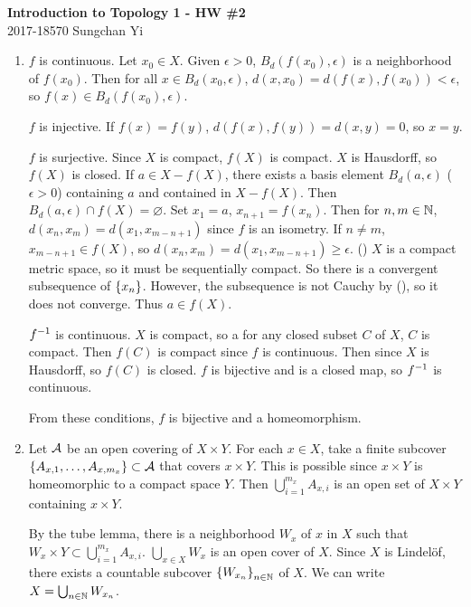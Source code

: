 \documentclass[12pt]{report}
\newcommand{\prob}[1]{\item[\large\textbf{\sffamily #1.}]}
\begin{document}
\begin{center}
    \textbf{\Large Introduction to Topology 1 - HW \#2}\\
    \large 2017-18570 Sungchan Yi
\end{center}
\begin{enumerate}
    \prob{1} \(f\) is continuous. Let \(x_0 \in X\). Given \(\epsilon > 0\), \(B_d(f(x_0), \epsilon)\) is a neighborhood of \(f(x_0)\). Then for all \(x \in B_d(x_0, \epsilon)\), \(d(x, x_0) = d(f(x), f(x_0)) < \epsilon\), so \(f(x) \in B_d(f(x_0), \epsilon)\).

    \(f\) is injective. If \(f(x) = f(y)\), \(d(f(x), f(y)) = d(x, y) = 0\), so \(x = y\).

    \(f\) is surjective. Since \(X\) is compact, \(f(X)\) is compact. \(X\) is Hausdorff, so \(f(X)\) is closed. If \(a \in X - f(X)\), there exists a basis element \(B_d(a, \epsilon)\) (\(\epsilon > 0\)) containing \(a\) and contained in \(X - f(X)\). Then \(B_d(a, \epsilon) \cap f(X) = \varnothing\). Set \(x_1 = a\), \(x_{n+1} = f(x_n)\). Then for \(n, m \in \mathbb{N}\), \(d(x_n, x_m) = d(x_1, x_{m-n+1})\) since \(f\) is an isometry. If \(n \neq m\), \(x_{m-n+1} \in f(X)\), so \(d(x_n, x_m) = d(x_1, x_{m-n+1}) \geq \epsilon\). (\mast) \(X\) is a compact metric space, so it must be sequentially compact. So there is a convergent subsequence of \(\left\{ x_n \right\}\). However, the subsequence is not Cauchy by (\mast), so it does not converge. Thus \(a \in f(X)\).

    \(f^{-1}\) is continuous. \(X\) is compact, so a for any closed subset \(C\) of \(X\), \(C\) is compact. Then \(f(C)\) is compact since \(f\) is continuous. Then since \(X\) is Hausdorff, so \(f(C)\) is closed. \(f\) is bijective and is a closed map, so \(f^{-1}\) is continuous.

    From these conditions, \(f\) is bijective and a homeomorphism.

    \prob{2} Let \(\mathcal{A}\) be an open covering of \(X \times Y\). For each \(x \in X\), take a finite subcover \(\{A_{x, 1}, \dots, A_{x, m_x}\} \\\subset \mathcal{A}\) that covers \(x \times Y\). This is possible since \(x \times Y\) is homeomorphic to a compact space \(Y\). Then \(\bigcup_{i=1}^{m_x} A_{x, i}\) is an open set of \(X \times Y\) containing \(x \times Y\).

    By the tube lemma, there is a neighborhood \(W_x\) of \(x\) in \(X\) such that \(W_x \times Y \subset \bigcup_{i=1}^{m_x} A_{x, i}\). \(\bigcup_{x \in X} W_x\) is an open cover of \(X\). Since \(X\) is Lindelöf, there exists a countable subcover \(\left\{ W_{x_n} \right\}_{n \in \mathbb{N}}\) of \(X\). We can write \(X = \bigcup_{n \in \mathbb{N}} W_{x_n}\).


\end{enumerate}
\end{document}
